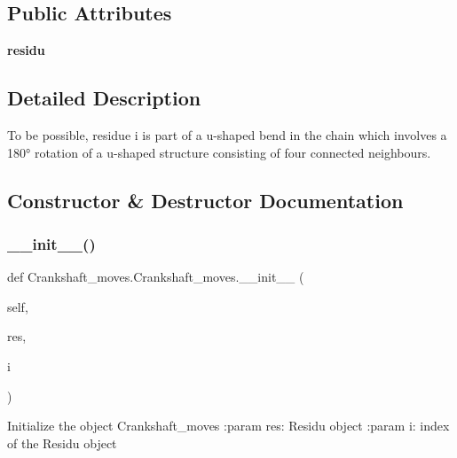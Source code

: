 \subsection*{Public Attributes}
\begin{DoxyCompactItemize}
\item 
\mbox{\label{classCrankshaft__moves_1_1Crankshaft__moves_a88f703bb354d88edc6eb75b25179ecd7}} 
{\bfseries residu}
\end{DoxyCompactItemize}


\subsection{Detailed Description}
\begin{DoxyVerb}To be possible, residue i is part of a u-shaped bend in the chain which
    involves a 180° rotation of a u-shaped structure consisting
    of four connected neighbours.
\end{DoxyVerb}
 

\subsection{Constructor \& Destructor Documentation}
\mbox{\label{classCrankshaft__moves_1_1Crankshaft__moves_a5f336d38f0adee71bf8d6c9a9c0b4d7e}} 
\subsubsection{\texorpdfstring{\+\_\+\+\_\+init\+\_\+\+\_\+()}{\_\_init\_\_()}}
{\footnotesize\ttfamily def Crankshaft\+\_\+moves.\+Crankshaft\+\_\+moves.\+\_\+\+\_\+init\+\_\+\+\_\+ (\begin{DoxyParamCaption}\item[{}]{self,  }\item[{}]{res,  }\item[{}]{i }\end{DoxyParamCaption})}

\begin{DoxyVerb}Initialize the object Crankshaft_moves
    :param res: Residu object
    :param   i: index of the Residu object
\end{DoxyVerb}
 

